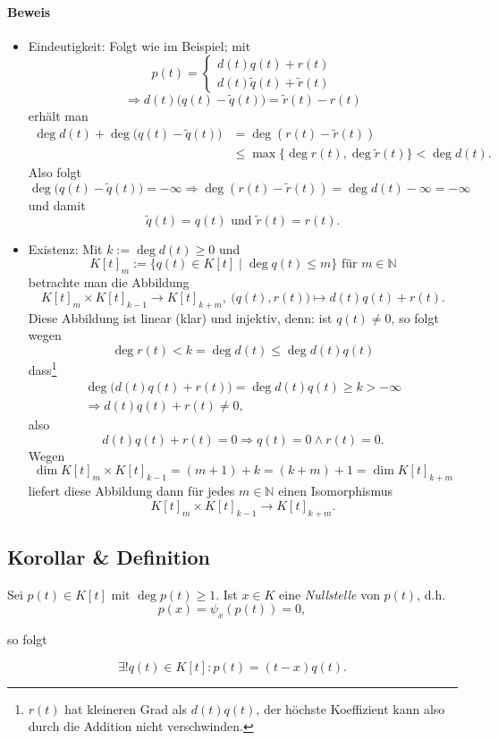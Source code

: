 \paragraph{Beweis}
	\begin{itemize}
	\item Eindeutigkeit: Folgt wie im Beispiel; mit
		\[
		p(t) =
			\begin{cases}
				d(t)q(t)+r(t)\\
				d(t)\tilde{q}(t)+\tilde{r}(t)
			\end{cases}
		\]
		\[
			\Rightarrow d(t)\big(q(t)-\tilde{q}(t)\big) = \tilde{r}(t)-r(t)
		\]
	erhält man
		\begin{align*}
			\deg d(t) + \deg \big(q(t)-\tilde{q}(t)\big) &= \deg (r(t)-\tilde{r}(t))\\
			&\leq \max \{\deg r(t), \deg \tilde{r} (t)\} < \deg d(t).
		\end{align*}
	Also folgt
		\[ \deg\big(q(t)-\tilde{q}(t)\big) = -\infty \Rightarrow \deg (r(t)-\tilde{r}(t)) = \deg d(t) -\infty = - \infty \]
	und damit
		\[ \tilde{q}(t)=q(t) \text{ und }\tilde{r}(t) = r(t). \]
	
	\item Existenz: Mit $ k := \deg d(t) \geq 0 $ und
		\[ K[t]_m := \{q(t)\in K[t]\mid \deg q(t)\leq m \} \text{ für }m\in \mathbb{N} \]
	betrachte man die Abbildung
		\[ K[t]_m \times K[t]_{k-1}\to K[t]_{k+m},\ \big(q(t), r(t)\big) \mapsto d(t)q(t)+r(t). \]
	Diese Abbildung ist linear (klar) und injektiv, denn:
	ist $ q(t) \neq 0 $, so folgt wegen
		\[ \deg r(t) < k = \deg d(t)\leq \deg d(t)q(t) \]
	dass\footnote{$r(t)$ hat kleineren Grad als $d(t)q(t)$, der höchste Koeffizient kann also durch die Addition nicht verschwinden.}
		\begin{gather*}
			\deg \big(d(t)q(t) + r(t)\big) = \deg d(t)q(t)\geq k > -\infty\\
			\Rightarrow d(t)q(t)+r(t)\neq 0,
		\end{gather*}
	also
		\[ d(t)q(t)+r(t)=0 \Rightarrow q(t)=0 \land r(t) = 0. \] %
	Wegen
		\[ \dim K[t]_m \times K[t]_{k-1} = (m+1) + k = (k+m) + 1 = \dim K[t]_{k+m} \]
	liefert diese Abbildung dann für jedes $ m\in \mathbb{N} $ einen Isomorphismus
		\[ K[t]_m \times K[t]_{k-1} \to K[t]_{k+m}. \]
	\end{itemize}
\subsection{Korollar \& Definition}
	\begin{Definition}[Nullstelle]
	Sei $ p(t)\in K[t] $ mit $ \deg p(t)\geq 1 $. Ist $ x\in K $ eine \emph{Nullstelle} von $ p(t) $, d.h.
		\[ p(x) = \psi_x(p(t)) = 0, \]
	\end{Definition}
	so folgt
	\begin{Korollar}
		\[ \exists! q(t)\in K[t]: p(t) = (t-x) q(t). \]
	\end{Korollar}
